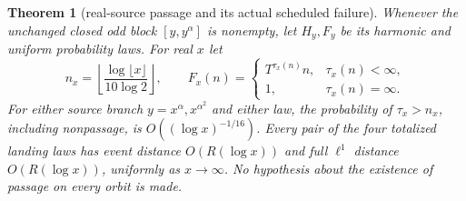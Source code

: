 \documentclass[11pt]{article}
\newtheorem{theorem}[proposition]{Theorem}
\theoremstyle{remark}\newtheorem{remark}[proposition]{Remark}
\begin{document}
\begin{theorem}[real-source passage and its actual scheduled failure]
\label{thm:mazur-real-passage}
Whenever the unchanged closed odd block \([y,y^\alpha]\) is nonempty,
let \(H_y,F_y\) be its harmonic and uniform probability laws.
For real \(x\) let
\[
 n_x=\left\lfloor\frac{\log\lfloor x\rfloor}{10\log2}\right\rfloor,
 \qquad
 F_x(n)=
 \begin{cases}T^{\tau_x(n)}n,&\tau_x(n)<\infty,\\1,&\tau_x(n)=\infty.
 \end{cases}
\]
For either source branch \(y=x^\alpha,x^{\alpha^2}\) and either law,
the probability of \(\tau_x>n_x\), including nonpassage, is
\(O((\log x)^{-1/16})\). Every pair of the four totalized landing
laws has event distance \(O(R(\log x))\) and full \(\ell^1\)
distance \(O(R(\log x))\), uniformly as \(x\to\infty\).
No hypothesis about the existence of passage on every orbit is made.
\end{theorem}
\end{document}
